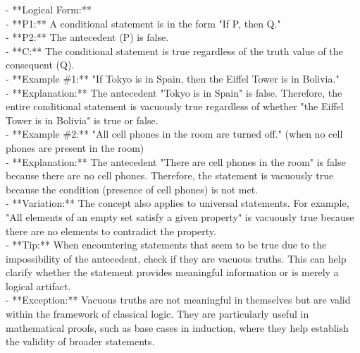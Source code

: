 \documentclass[a4paper,12pt,single,pdftex]{scrartcl}
\begin{document}
    
      - **Logical Form:**
    \\

    
        - **P1:** A conditional statement is in the form "If P, then Q."
    \\

    
        - **P2:** The antecedent (P) is false.
    \\

    
        - **C:** The conditional statement is true regardless of the truth value of the consequent (Q).
    \\

    
      - **Example \#1:** "If Tokyo is in Spain, then the Eiffel Tower is in Bolivia."
    \\

    
      - **Explanation:** The antecedent "Tokyo is in Spain" is false. Therefore, the entire conditional statement is vacuously true regardless of whether "the Eiffel Tower is in Bolivia" is true or false.
    \\

    
      - **Example \#2:** "All cell phones in the room are turned off." (when no cell phones are present in the room)
    \\

    
      - **Explanation:** The antecedent "There are cell phones in the room" is false because there are no cell phones. Therefore, the statement is vacuously true because the condition (presence of cell phones) is not met.
    \\

    
      - **Variation:** The concept also applies to universal statements. For example, "All elements of an empty set satisfy a given property" is vacuously true because there are no elements to contradict the property.
    \\

    
      - **Tip:** When encountering statements that seem to be true due to the impossibility of the antecedent, check if they are vacuous truths. This can help clarify whether the statement provides meaningful information or is merely a logical artifact.
    \\

    
      - **Exception:** Vacuous truths are not meaningful in themselves but are valid within the framework of classical logic. They are particularly useful in mathematical proofs, such as base cases in induction, where they help establish the validity of broader statements.
    \\
\end{document}
